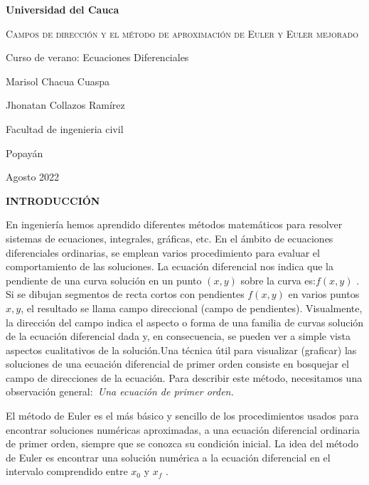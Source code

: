 \documentclass[12 pt,letterpaper]{article}
\begin{document}
	
	
	\begin{titlepage}
		\centering
		
		\vspace{1cm}
		{\bfseries\LARGE Universidad del Cauca \par}
		\vspace{5cm}
		
		{\scshape\Large Campos de direcci\'on y el m\'etodo de aproximaci\'on de Euler y Euler mejorado\par}
		\vspace{3cm}
		{\Large Curso de verano: Ecuaciones Diferenciales\par}
		\vfill
		{\Large Marisol Chacua Cuaspa \par}
		\vfill
		{\Large Jhonatan Collazos Ramírez \par}
		\vfill
		{\Large Facultad de ingenieria civil\par}
		{\Large Popayán\par}
		{\Large Agosto 2022\par}
	\end{titlepage}
	
	\centering
	\textbf{\LARGE{INTRODUCCI\'ON }}
	
	
	\justify 
	En ingeniería hemos aprendido diferentes métodos matemáticos para resolver sistemas de ecuaciones, integrales, gráficas, etc. En el ámbito de ecuaciones diferenciales ordinarias, se emplean varios procedimiento para evaluar el comportamiento de las soluciones. La ecuación diferencial nos indica que la pendiente de una curva solución en un punto {$(x, y)$} sobre la curva es:{$ f(x, y)$}  . Si se dibujan segmentos de recta cortos con pendientes {$ f(x, y)$} en varios puntos  {$x, y$}, el resultado se llama campo direccional (campo de pendientes). Visualmente, la dirección del campo indica el aspecto o forma de una familia de curvas solución de la ecuación diferencial dada y, en consecuencia, se pueden ver a simple vista aspectos cualitativos de la solución.Una técnica útil para visualizar (graficar) las soluciones de una ecuación diferencial de primer orden consiste en bosquejar el campo de direcciones de la ecuación. Para describir este método, necesitamos una observación general:{\itshape\ Una ecuación de primer orden.}\vspace{0.4Cm}
	
	El método de Euler es el más básico y sencillo de los procedimientos usados para encontrar soluciones numéricas aproximadas, a una ecuación diferencial ordinaria de primer orden, siempre que se conozca su condición inicial. La idea del método de Euler es encontrar una solución numérica a la ecuación diferencial en el intervalo comprendido entre {$x_{0} $} y {$x_{f} $} .	\vspace{0.4Cm}
	
\end{document}
